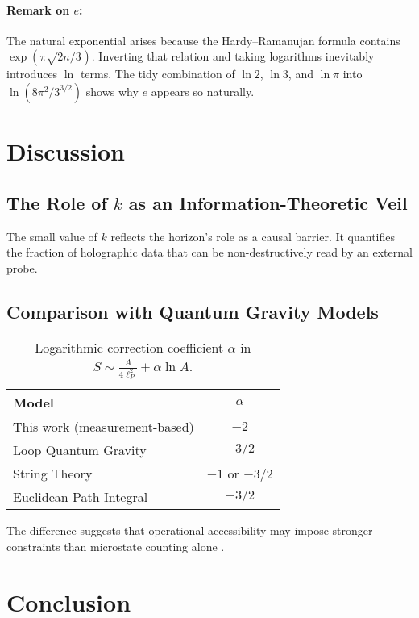 \documentclass[12pt, letterpaper]{article}
\begin{document}
\paragraph{Remark on $e$:} The natural exponential arises because the Hardy–Ramanujan formula contains $\exp(\pi\sqrt{2n/3})$. Inverting that relation and taking logarithms inevitably introduces $\ln$ terms. The tidy combination of $\ln 2$, $\ln 3$, and $\ln \pi$ into $\ln(8\pi^2/3^{3/2})$ shows why $e$ appears so naturally.

\section{Discussion}

\subsection{The Role of $k$ as an Information-Theoretic Veil}

The small value of $k$ reflects the horizon's role as a causal barrier. It quantifies the fraction of holographic data that can be non-destructively read by an external probe.

\subsection{Comparison with Quantum Gravity Models}

\begin{table}[h!]
\centering
\caption{Logarithmic correction coefficient $\alpha$ in $S \sim \frac{A}{4\ell_P^2} + \alpha \ln A$.}
\label{tab:comparison}
\begin{tabular}{lc}
\toprule
\textbf{Model} & $\alpha$ \\
\midrule
This work (measurement-based) & $-2$ \\
Loop Quantum Gravity \cite{kaul2000} & $-3/2$ \\
String Theory \cite{solodukhin1998} & $-1$ or $-3/2$ \\
Euclidean Path Integral \cite{cardy1986} & $-3/2$ \\
\bottomrule
\end{tabular}
\end{table}

The difference suggests that operational accessibility may impose stronger constraints than microstate counting alone \cite{wald2001}.

\section{Conclusion}
\end{document}
